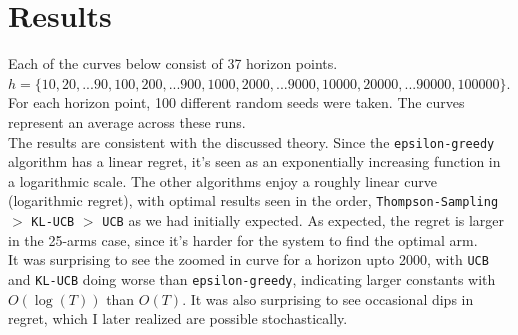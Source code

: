 \documentclass[11pt]{article}
\begin{document}
\section{Results}
Each of the curves below consist of 37 horizon points.\\$h = \{10, 20, ... 90, 100, 200, ... 900, 1000, 2000, ... 9000, 10000, 20000, ... 90000, 100000 \}$. For each horizon point, 100 different random seeds were taken. The curves represent an average across these runs.\\
The results are consistent with the discussed theory. Since the \texttt{epsilon-greedy} algorithm has a linear regret, it's seen as an exponentially increasing function in a logarithmic scale. The other algorithms enjoy a roughly linear curve (logarithmic regret), with optimal results seen in the order, \texttt{Thompson-Sampling} $>$ \texttt{KL-UCB} $>$ \texttt{UCB} as we had initially expected. As expected, the regret is larger in the 25-arms case, since it's harder for the system to find the optimal arm.\\
It was surprising to see the zoomed in curve for a horizon upto 2000, with \texttt{UCB} and \texttt{KL-UCB} doing worse than \texttt{epsilon-greedy}, indicating larger constants with $O(\log(T))$ than $O(T)$. It was also surprising to see occasional dips in regret, which I later realized are possible stochastically.
\end{document}
